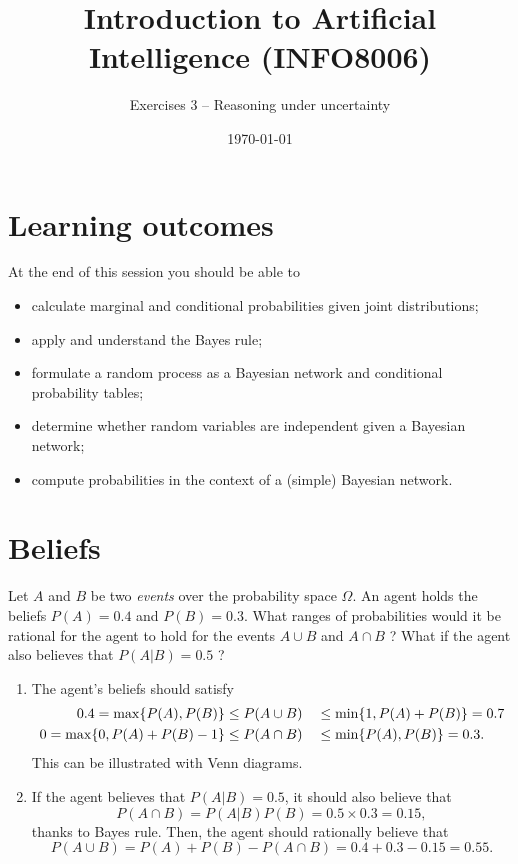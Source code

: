 \documentclass[11pt, a4paper]{article}
\title{Introduction to Artificial Intelligence (INFO8006)}
\subtitle{Exercises 3 -- Reasoning under uncertainty}
\date{\today}
\begin{document}
\maketitle

\section*{Learning outcomes}

At the end of this session you should be able to
\begin{itemize}[noitemsep]
    \item calculate marginal and conditional probabilities given joint distributions;
    \item apply and understand the Bayes rule;
    \item formulate a random process as a Bayesian network and conditional probability tables;
    \item determine whether random variables are independent given a Bayesian network;
    \item compute probabilities in the context of a (simple) Bayesian network.
\end{itemize}

\section{Beliefs}

Let $A$ and $B$ be two \emph{events} over the probability space $\Omega$. An agent holds the beliefs $P(A) = 0.4$ and $P(B) = 0.3$. What ranges of probabilities would it be rational for the agent to hold for the events $A \cup B$ and $A \cap B$ ? What if the agent also believes that $P(A | B) = 0.5$ ?

\begin{solution}
    \begin{enumerate}
        \item The agent's beliefs should satisfy
        \begin{alignat*}{2}
            0.4 = \max \{P(A), P(B)\} & \leq P(A \cup B) && \leq \min \{1, P(A) + P(B)\} = 0.7 \\
            0 = \max \{0, P(A) + P(B) - 1\} & \leq P(A \cap B) && \leq \min \{P(A), P(B)\} = 0.3 .
        \end{alignat*}
        This can be illustrated with Venn diagrams.

        \item If the agent believes that $P(A | B) = 0.5$, it should also believe that
        \begin{equation*}
            P(A \cap B) = P(A | B) P(B) = 0.5 \times 0.3 = 0.15,
        \end{equation*}
        thanks to Bayes rule. Then, the agent should rationally believe that
        \begin{equation*}
            P(A \cup B) = P(A) + P(B) - P(A \cap B) = 0.4 + 0.3 - 0.15 = 0.55.
        \end{equation*}
    \end{enumerate}
\end{solution}
\end{document}
